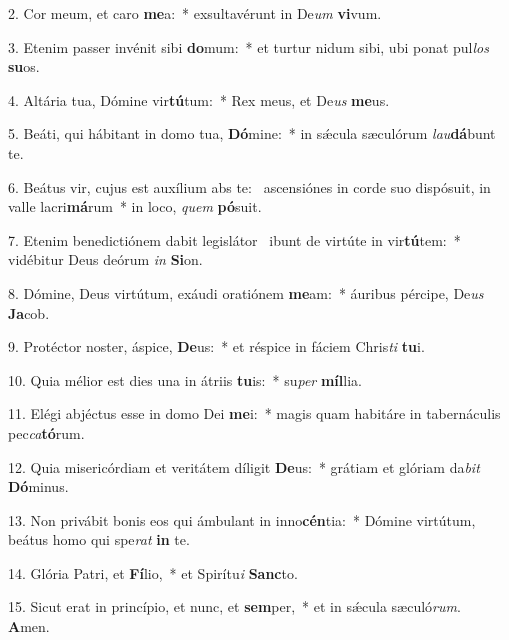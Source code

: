 2. Cor meum, et caro \textbf{me}a:~*  exsultavérunt in De\textit{um} \textbf{vi}vum.\

3. Etenim passer invénit sibi \textbf{do}mum:~*  et turtur nidum sibi, ubi ponat pul\textit{los} \textbf{su}os.\

4. Altária tua, Dómine vir\textbf{tú}tum:~*  Rex meus, et De\textit{us} \textbf{me}us.\

5. Beáti, qui hábitant in domo tua, \textbf{Dó}mine:~*  in sǽcula sæculórum \textit{lau}\textbf{dá}bunt te.\

6. Beátus vir, cujus est auxílium abs te: \dag\  ascensiónes in corde suo dispósuit, in valle lacri\textbf{má}rum~*  in loco, \textit{quem} \textbf{pó}suit.\

7. Etenim benedictiónem dabit legislátor \dag\  ibunt de virtúte in vir\textbf{tú}tem:~*  vidébitur Deus deórum \textit{in} \textbf{Si}on.\

8. Dómine, Deus virtútum, exáudi oratiónem \textbf{me}am:~*  áuribus pércipe, De\textit{us} \textbf{Ja}cob.\

9. Protéctor noster, áspice, \textbf{De}us:~*  et réspice in fáciem Chris\textit{ti} \textbf{tu}i.\

10. Quia mélior est dies una in átriis \textbf{tu}is:~*  su\textit{per} \textbf{míl}lia.\

11. Elégi abjéctus esse in domo Dei \textbf{me}i:~*  magis quam habitáre in tabernáculis pec\textit{ca}\textbf{tó}rum.\

12. Quia misericórdiam et veritátem díligit \textbf{De}us:~*  grátiam et glóriam da\textit{bit} \textbf{Dó}minus.\

13. Non privábit bonis eos qui ámbulant in inno\textbf{cén}tia:~*  Dómine virtútum, beátus homo qui spe\textit{rat} \textbf{in} te.\

14. Glória Patri, et \textbf{Fí}lio,~*  et Spirítu\textit{i} \textbf{Sanc}to.\

15. Sicut erat in princípio, et nunc, et \textbf{sem}per,~*  et in sǽcula sæculó\textit{rum}. \textbf{A}men.\

